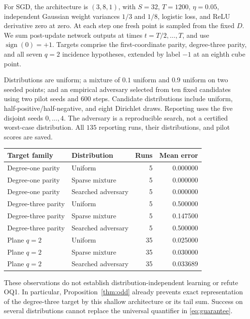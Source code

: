\documentclass[11pt]{article}
\DeclareMathOperator{\sign}{sign}
\newcommand{\1}{\mathbf 1}
\begin{document}
For SGD, the architecture is $(3,8,1)$, with $S=32$, $T=1200$, $\eta=0.05$, independent Gaussian weight variances $1/3$ and $1/8$, logistic loss, and ReLU derivative zero at zero. At each step one fresh point is sampled from the fixed $D$. We sum post-update network outputs at times $t=T/2,\ldots,T$, and use $\sign(0)=+1$. Targets comprise the first-coordinate parity, degree-three parity, and all seven $q=2$ incidence hypotheses, extended by label $-1$ at an eighth cube point.

Distributions are uniform; a mixture of $0.1$ uniform and $0.9$ uniform on two seeded points; and an empirical adversary selected from ten fixed candidates using two pilot seeds and $600$ steps. Candidate distributions include uniform, half-positive/half-negative, and eight Dirichlet draws. Reporting uses the five disjoint seeds $0,\ldots,4$. The adversary is a reproducible search, not a certified worst-case distribution. All $135$ reporting runs, their distributions, and pilot scores are saved.

\begin{center}\small
\begin{tabular}{llrr}
\toprule
Target family & Distribution & Runs & Mean error\\
\midrule
Degree-one parity & Uniform &5&0.000000\\
Degree-one parity & Sparse mixture &5&0.000000\\
Degree-one parity & Searched adversary &5&0.000000\\
Degree-three parity & Uniform &5&0.500000\\
Degree-three parity & Sparse mixture &5&0.147500\\
Degree-three parity & Searched adversary &5&0.500000\\
Plane $q=2$ & Uniform &35&0.025000\\
Plane $q=2$ & Sparse mixture &35&0.030000\\
Plane $q=2$ & Searched adversary &35&0.033689\\
\bottomrule
\end{tabular}\end{center}

These observations do not establish distribution-independent learning or refute OQ1. In particular, Proposition~\ref{thm:odd} already prevents exact representation of the degree-three target by this shallow architecture or its tail sum. Success on several distributions cannot replace the universal quantifier in \eqref{eq:guarantee}.
\end{document}
